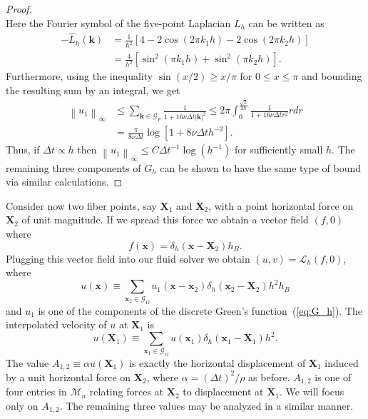 \documentclass[preprint,12pt]{elsarticle}
\newcommand{\norm}[1]{\left\lVert#1\right\rVert}
\begin{document}
\begin{proof}
\begin{equation}
\end{equation}
Here the Fourier symbol of the five-point Laplacian $L_h$ can be written as
\begin{equation}
\begin{split}
-\widehat{L}_h(\mathbf{k}) 
&=
\frac{1}{h^2}\left[
4 - 2\cos(2 \pi k_1h) - 2\cos(2 \pi k_2h)
\right] \\
&=
\frac{4}{h^2}\left[
\sin^2(\pi k_1h) + \sin^2(\pi k_2h)
\right].
\end{split}
\end{equation}
Furthermore, using the inequality $\sin (x/2) \geq x/\pi$ for $0 \leq x \leq \pi$ and bounding the resulting sum by an integral, we get
\begin{equation}
\begin{split}
\norm{u_1}_\infty &\leq
\sum_{\mathbf{k} \in \mathcal{G}_F }
\frac{1}{1 + 16\nu\Delta t |\mathbf{k}|^2}
\leq 2 \pi \int_0^{\frac{\sqrt{2} }{2h}}\frac{1}{1 + 16\nu\Delta t r^2}rdr \\
&= \frac{\pi}{8 \nu \Delta t} \log[ 1 + 8 \nu \Delta t h^{-2}].
\end{split}
\end{equation}
Thus, if $\Delta t \propto h$ then $\norm{u_1}_\infty \leq C {\Delta t}^{-1}\log(h^{-1})$ for sufficiently small $h$.
The remaining three components of $G_h$ can be shown to have the same type of bound via similar calculations.
\end{proof}

Consider now two fiber points, say $\mathbf{X}_1$ and $\mathbf{X}_2$, with a point horizontal force on $\mathbf{X}_2$ of unit magnitude. If we spread this force we obtain a vector field $(f,0)$ where
\begin{equation}
f(\mathbf{x}) = \delta_h(\mathbf{x} - \mathbf{X}_2)h_B.
\end{equation}
Plugging this vector field into our fluid solver we obtain $(u,v)=\mathcal{L}_h(f,0)$, where
\begin{equation}
u(\mathbf{x}) \equiv
\sum_{\mathbf{x}_2\in\mathcal{G}_\Omega}
u_1(\mathbf{x}-\mathbf{x}_2)\delta_h(\mathbf{x}_2-\mathbf{X}_2)h^2h_B \label{eq:ux}
\end{equation}
and $u_1$ is one of the components of the discrete Green's function~(\ref{eq:G_h}). 
The interpolated velocity of $u$ at $\mathbf{X}_1$ is
\begin{equation}
u(\mathbf{X}_1) \equiv
\sum_{\mathbf{x}_1\in\mathcal{G}_\Omega}
u(\mathbf{x}_1)\delta_h(\mathbf{x}_1 - \mathbf{X}_1)h^2. \label{eq:uX1}
\end{equation}
The value $A_{1,2} \equiv \alpha u(\mathbf{X}_1)$ is exactly the horizontal displacement of $\mathbf{X}_1$ induced by a unit horizontal force on $\mathbf{X}_2$, where $\alpha = ({\Delta t})^2/\rho$ as before. $A_{1,2}$ is one of four entries in $\mathcal{M}_n$ relating forces at $\mathbf{X}_2$ to displacement at $\mathbf{X}_1$. We will focus only on $A_{1,2}$. The remaining three values may be analyzed in a similar manner.
\end{document}
